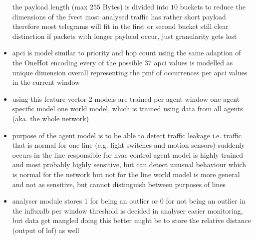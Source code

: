 \begin{itemize}
		\subitem the payload length (max $255$ Bytes) is divided into $10$ buckets to reduce the dimensions of the \gls{fvect}
		\subitem most analysed traffic has rather short payload
		\subitem therefore most telegrams will fit in the first or second bucket
		\subitem still clear distinction if packets with longer payload occur, just granularity gets lost
	\item \gls{apci} is model similar to priority and hop count using the same adaption of the OneHot encoding
		\subitem every of the possible \alert{37}  \gls{apci} values is modelled as unique dimension
		\subitem overall representing the \gls{pmf} of occurrences per \gls{apci} values in the current window
		
	\item using this feature vector 2 models are trained per agent window
		\subitem one agent specific model
		\subitem one world model, which is trained using data from all agents (aka. the whole network)
	\item purpose of the agent model is to be able to detect traffic leakage
		\subitem i.e. traffic that is normal for one line (e.g. light switches and motion sensors) suddenly occurs in the line responsible for \gls{hvac} control
		\subitem agent model is highly trained and most probably highly sensitive, but can detect unusual behaviour which is normal for the network but not for the line
		\subitem world model is more general and not as sensitive, but cannot distinguish between purposes of lines
	\item analyser module stores 1 for being an outlier or 0 for not being an outlier in the \gls{influxdb} per window
		\subitem threshold is decided in analyser
		\subitem easier monitoring, but data get mangled doing this
		\subitem better might be to store the relative distance (output of \gls{lof}) as well
	
\end{itemize}

